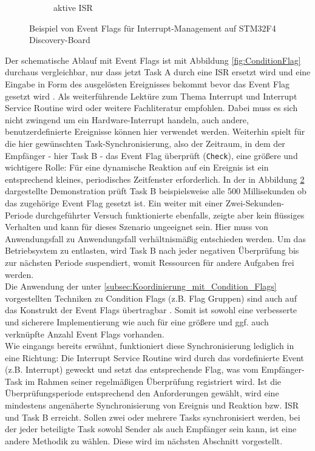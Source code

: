 \documentclass{llncs}
\begin{document}
\begin{figure}
\begin{subfigure}{.250\textwidth}
		\caption{aktive ISR}
		\label{fig:EventFlagAn}
	\end{subfigure}
	\caption{Beispiel von Event Flags für Interrupt-Management auf STM32F4 Discovery-Board}
	\label{fig:EventFlagBeispiel}
\end{figure}

Der schematische Ablauf mit Event Flags ist mit Abbildung \ref{fig:ConditionFlag} durchaus vergleichbar, nur dass jetzt Task A durch eine ISR ersetzt wird und eine Eingabe in Form des ausgelösten Ereignisses bekommt bevor das Event Flag gesetzt wird \autocite[vgl.][87]{Cooling2017}. Als weiterführende Lektüre zum Thema Interrupt und Interrupt Service Routine wird \autocite{MikrocontrollerInterrupt} oder weitere Fachliteratur empfohlen. Dabei muss es sich nicht zwingend um ein Hardware-Interrupt handeln, auch andere, benutzerdefinierte Ereignisse können hier verwendet werden. Weiterhin spielt für die hier gewünschten Task-Synchronisierung, also der Zeitraum, in dem der Empfänger - hier Task B - das Event Flag überprüft (\texttt{Check}), eine größere und wichtigere Rolle: Für eine dynamische Reaktion auf ein Ereignis ist ein entsprechend kleines, periodisches Zeitfenster erforderlich. In der in Abbildung \ref{fig:EventFlagBeispiel} dargestellte Demonstration prüft Task B beispielsweise alle 500 Millisekunden ob das zugehörige Event Flag gesetzt ist. Ein weiter mit einer Zwei-Sekunden-Periode durchgeführter Versuch funktionierte ebenfalls, zeigte aber kein flüssiges Verhalten und kann für dieses Szenario ungeeignet sein. Hier muss von Anwendungsfall zu Anwendungsfall verhältnismäßig entschieden werden. Um das Betriebsystem zu entlasten, wird Task B nach jeder negativen Überprüfung bis zur nächsten Periode suspendiert, womit Ressourcen für andere Aufgaben frei werden.\\ 

Die Anwendung der unter \ref{subsec:Koordinierung_mit_Condition_Flags} vorgestellten Techniken zu Condition Flags (z.B. Flag Gruppen) sind auch auf das Konstrukt der Event Flags übertragbar \autocite[vgl.][87-88]{Cooling2017}. Somit ist sowohl eine verbesserte und sicherere Implementierung wie auch für eine größere und ggf. auch verknüpfte Anzahl Event Flags vorhanden.\\

Wie eingangs bereits erwähnt, funktioniert diese Synchronisierung lediglich in eine Richtung: Die Interrupt Service Routine wird durch das vordefinierte Event (z.B. Interrupt) geweckt und setzt das entsprechende Flag, was vom Empfänger-Task im Rahmen seiner regelmäßigen Überprüfung registriert wird. Ist die Überprüfungsperiode entsprechend den Anforderungen gewählt, wird eine mindestens angenäherte Synchronisierung von Ereignis und Reaktion bzw. ISR und Task B erreicht. Sollen zwei oder mehrere Tasks synchronisiert werden, bei der jeder beteiligte Task sowohl Sender als auch Empfänger sein kann, ist eine andere Methodik zu wählen. Diese wird im nächsten Abschnitt vorgestellt.
\end{document}
